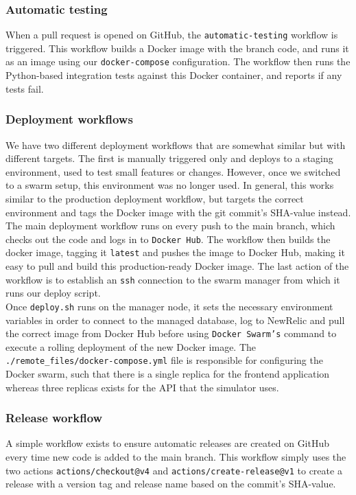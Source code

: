 \documentclass{article}
\begin{document}
\subsubsection{Automatic testing}
When a pull request is opened on GitHub, the \texttt{automatic-testing} workflow is triggered. This workflow builds a Docker image with the branch code, and runs it as an image using our \texttt{docker-compose} configuration. The workflow then runs the Python-based integration tests against this Docker container, and reports if any tests fail. 

\subsubsection{Deployment workflows}
We have two different deployment workflows that are somewhat similar but with different targets. The first is manually triggered only and deploys to a staging environment, used to test small features or changes. However, once we switched to a swarm setup, this environment was no longer used. In general, this works similar to the production deployment workflow, but targets the correct environment and tags the Docker image with the git commit's SHA-value instead.\\
The main deployment workflow runs on every push to the main branch, which checks out the code and logs in to \texttt{Docker Hub}. The workflow then builds the docker image, tagging it \texttt{latest} and pushes the image to Docker Hub, making it easy to pull and build this production-ready Docker image. The last action of the workflow is to establish an \texttt{ssh} connection to the swarm manager from which it runs our deploy script.\\
Once \texttt{deploy.sh} runs on the manager node, it sets the necessary environment variables in order to connect to the managed database, log to NewRelic and pull the correct image from Docker Hub before using \texttt{Docker Swarm's} command to execute a rolling deployment of the new Docker image. The \texttt{./remote\_files/docker-compose.yml} file is responsible for configuring the Docker swarm, such that there is a single replica for the frontend application whereas three replicas exists for the API that the simulator uses.\\

\subsubsection{Release workflow}
A simple workflow exists to ensure automatic releases are created on GitHub every time new code is added to the main branch. This workflow simply uses the two actions \texttt{actions/checkout@v4} and \texttt{actions/create-release@v1} to create a release with a version tag and release name based on the commit's SHA-value.
\end{document}
